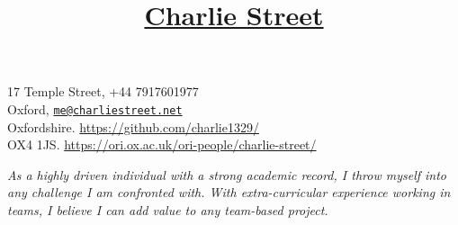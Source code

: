 \documentclass[11pt]{article}
\title{\vspace{-80pt}\underline{Charlie Street}}
\date{}
\begin{document}
	\maketitle
	\vspace*{-60pt}
	\begin{flushleft}
	\noindent
	\large 17 Temple Street,
	\hfill
	\large +44 7917601977 \\
	\large Oxford,
	\hfill 
	\large \href{mailto:me@charliestreet.net}{\nolinkurl{me@charliestreet.net}} \\
	\large Oxfordshire. 
	\hfill
	\large
	\url{https://github.com/charlie1329/}\\
	\large OX4 1JS.
	\hfill
	\large
	\url{https://ori.ox.ac.uk/ori-people/charlie-street/} \\
	\end{flushleft}

	\vspace{-10pt}
	\begin{center}
			\textit{\large As a highly driven individual with a strong academic record, I throw myself into any challenge I am confronted with. With extra-curricular experience working in teams, I believe I can add value to any team-based project.}
	\end{center}
			
\end{document}

